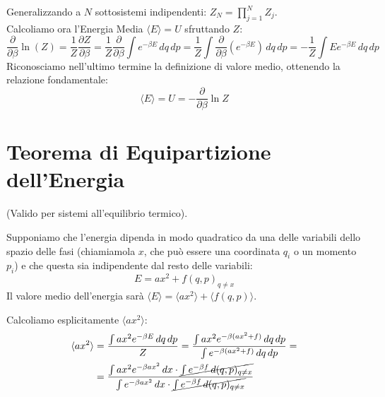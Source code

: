 \documentclass[11pt, a4paper]{article}
\begin{document}
Generalizzando a $N$ sottosistemi indipendenti: $Z_N = \prod_{j=1}^N Z_j$.\\

\noindent
Calcoliamo ora l'Energia Media $\langle E \rangle = U$ sfruttando $Z$:
\begin{equation*}
    \frac{\partial}{\partial \beta} \ln(Z) = \frac{1}{Z} \frac{\partial Z}{\partial \beta} = \frac{1}{Z} \frac{\partial}{\partial \beta} \int e^{-\beta E} \, dq \, dp = \frac{1}{Z} \int \frac{\partial}{\partial \beta}(e^{-\beta E}) \, dq \, dp = -\frac{1}{Z} \int E e^{-\beta E} \, dq \, dp
\end{equation*}
Riconosciamo nell'ultimo termine la definizione di valore medio, ottenendo la relazione fondamentale:
\begin{equation}
    \boxed{ \langle E \rangle = U = -\frac{\partial}{\partial \beta} \ln Z }
\end{equation}

\section{Teorema di Equipartizione dell'Energia}
(Valido per sistemi all'equilibrio termico).

\noindent
Supponiamo che l'energia dipenda in modo quadratico da una delle variabili dello spazio delle fasi (chiamiamola $x$, che può essere una coordinata $q_i$ o un momento $p_i$) e che questa sia indipendente dal resto delle variabili:
\begin{equation*}
    E = a x^2 + f(q,p)_{q \neq x}
\end{equation*}
Il valore medio dell'energia sarà $\langle E \rangle = \langle a x^2 \rangle + \langle f(q,p) \rangle$.

Calcoliamo esplicitamente $\langle a x^2 \rangle$:
\begin{align*}
    \langle a x^2 \rangle &= \frac{\int a x^2 e^{-\beta E} \, dq \, dp}{Z} = \frac{\int a x^2 e^{-\beta(a x^2 + f)} \, dq \, dp}{\int e^{-\beta(a x^2 + f)} \, dq \, dp} = \\
    &= \frac{\int a x^2 e^{-\beta a x^2} \, dx \cdot \cancel{\int e^{-\beta f} \, d(q,p)_{q \neq x}}}{\int e^{-\beta a x^2} \, dx \cdot \cancel{\int e^{-\beta f} \, d(q,p)_{q \neq x}}}
\end{align*}
\end{document}
